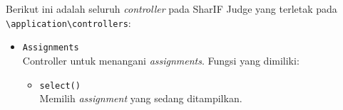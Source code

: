 Berikut ini adalah seluruh \textit{controller} pada SharIF Judge yang terletak pada \verb|\application\controllers|:

\begin{itemize}
	\item \verb|Assignments| \\Controller untuk menangani \textit{assignments}.
	Fungsi yang dimiliki:
	\begin{itemize}
		\item \verb|select()|\\ Memilih \textit{assignment} yang sedang ditampilkan.
	\end{itemize}
\end{itemize}
